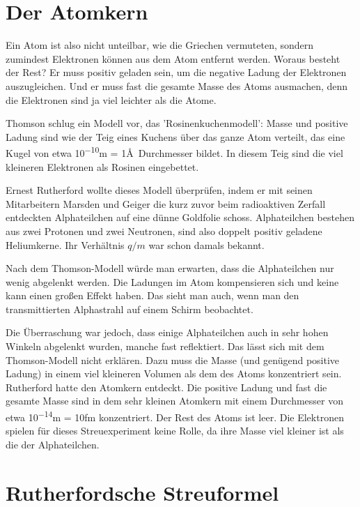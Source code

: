 \section{Der Atomkern}

Ein Atom ist also nicht unteilbar, wie die Griechen vermuteten, sondern zumindest Elektronen können aus dem Atom entfernt werden. Woraus besteht der Rest? Er muss positiv geladen sein, um die negative Ladung der Elektronen auszugleichen. Und er muss fast die gesamte Masse des Atoms ausmachen, denn die Elektronen sind ja viel leichter als die Atome.

Thomson schlug ein Modell vor, das 'Rosinenkuchenmodell': Masse und positive Ladung sind wie der Teig eines Kuchens über das ganze Atom verteilt, das eine Kugel von etwa \si{10^{-10}}{m} = 1\AA\ Durchmesser bildet. In diesem Teig sind die viel kleineren Elektronen als Rosinen eingebettet.

Ernest Rutherford wollte dieses Modell überprüfen, indem er mit seinen Mitarbeitern Marsden und Geiger die kurz zuvor beim radioaktiven Zerfall entdeckten Alphateilchen auf eine dünne Goldfolie schoss. Alphateilchen bestehen aus zwei Protonen und zwei Neutronen, sind also doppelt positiv geladene Heliumkerne. Ihr Verhältnis $q/m$ war schon damals bekannt.

Nach dem Thomson-Modell würde man erwarten, dass die Alphateilchen nur wenig abgelenkt werden. Die Ladungen im Atom kompensieren sich und keine kann einen großen Effekt haben. Das sieht man auch, wenn man den transmittierten Alphastrahl auf einem Schirm beobachtet.

Die Überraschung war jedoch, dass einige Alphateilchen auch in sehr hohen Winkeln abgelenkt wurden, manche fast reflektiert. Das lässt sich mit dem Thomson-Modell nicht erklären. Dazu muss die Masse (und genügend positive Ladung) in einem viel kleineren Volumen als dem des Atoms konzentriert sein. Rutherford hatte den Atomkern entdeckt. Die positive Ladung und fast die gesamte Masse sind in dem sehr kleinen Atomkern mit einem Durchmesser von etwa \si{10^{-14}}{m} = \si{10}{fm} konzentriert. Der Rest des Atoms ist leer. Die Elektronen spielen für dieses Streuexperiment keine Rolle, da ihre Masse viel kleiner ist als die der Alphateilchen.

\section{Rutherfordsche Streuformel}

